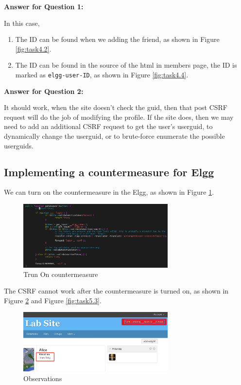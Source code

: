 \documentclass[a4paper,11pt]{article}
\begin{document}
\textbf{Answer for Question 1:} 

In this case,
\begin{enumerate}
    \item The ID can be found when we adding the friend, as shown in Figure \ref{fig:task4.2}.
    \item The ID can be found in the source of the html in members page, the ID is marked as \verb|elgg-user-ID|, as shown in Figure \ref{fig:task4.4}.
\end{enumerate}

\textbf{Answer for Question 2:} 

It should work, when the site doesn't check the guid, then that post CSRF request will do the job of modifying the profile. If the site does, then we may need to add an additional CSRF request to get the user's userguid, to dynamically change the userguid, or to brute-force enumerate the possible userguids.

\subsection{Implementing a countermeasure for Elgg}

We can turn on the countermeasure in the Elgg, as shown in Figure \ref{fig:task5.1}.
\begin{figure}[h]
    \centering
       \includegraphics[width=0.7\textwidth]{figures/task5/task5.1.png}
    \caption{Trun On countermeasure}\label{fig:task5.1}
\end{figure}

The CSRF cannot work after the countermeasure is turned on, as shown in Figure \ref{fig:task5.2} and Figure \ref{fig:task5.3}.
\begin{figure}[h]
    \centering
       \includegraphics[width=0.7\textwidth]{figures/task5/task5.2.png}
    \caption{Observations}\label{fig:task5.2}
\end{figure}
\end{document}
